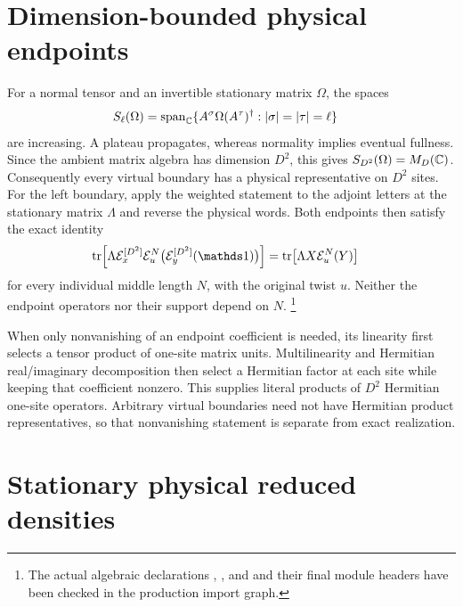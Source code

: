 \documentclass[11pt]{article}
\begin{document}
\section{Dimension-bounded physical endpoints}

For a normal tensor and an invertible stationary matrix $\Omega$, the spaces
\begin{align}
    S_\ell(\Omega) & =\operatorname{span}_{\mathbb{C}}
    \{A^\sigma\Omega(A^\tau)^\dagger:|\sigma|=|\tau|=\ell\}
    \notag
\end{align}
are increasing. A plateau propagates, whereas normality implies eventual
fullness. Since the ambient matrix algebra has dimension $D^2$, this gives
$S_{D^2}(\Omega)=M_D(\mathbb{C})$. Consequently every virtual boundary has a
physical representative on $D^2$ sites.
For the left boundary, apply the weighted statement to the adjoint letters
at the stationary matrix $\Lambda$ and reverse the physical words.
Both endpoints then satisfy the exact identity
\begin{align}
    \operatorname{tr}\!\left[\Lambda\mathcal E_x^{[D^2]}
        \mathcal E_u^N\bigl(\mathcal E_y^{[D^2]}(\Id)\bigr)\right]
     & =\operatorname{tr}\!\left[\Lambda X\mathcal E_u^N(Y)\right]
    \notag
\end{align}
for every individual middle length $N$, with the original twist $u$.
Neither the endpoint operators nor their support depend on $N$.
\footnote{The actual algebraic declarations
    ,
    , and
    and their final module headers have been checked in the production import
    graph.}

When only nonvanishing of an endpoint coefficient is needed, its linearity
first selects a tensor product of one-site matrix units. Multilinearity and
Hermitian real/imaginary decomposition then select a Hermitian factor at
each site while keeping that coefficient nonzero. This supplies literal
products of $D^2$ Hermitian one-site operators. Arbitrary virtual boundaries
need not have Hermitian product representatives, so that nonvanishing
statement is separate from exact realization.

\section{Stationary physical reduced densities}
\label{sec:pgwsvc08_stationary_physical_densities}
\end{document}

